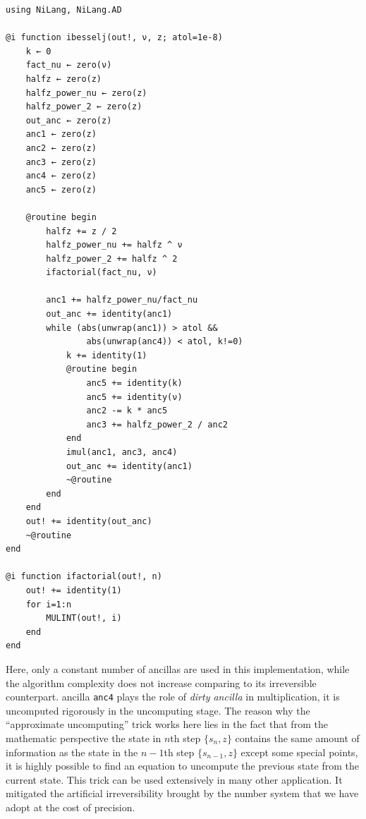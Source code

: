 \documentclass[aps,twocolumn,longbibliography,english,superscriptaddress]{revtex4-1}
\newcommand{\<}{\langle}
\renewcommand{\>}{\rangle}
\theoremstyle{definition}\newtheorem{definition}{\textit{Definition}}
\begin{document}
\begin{minipage}{.44\textwidth}
\begin{lstlisting}
using NiLang, NiLang.AD

@i function ibesselj(out!, ν, z; atol=1e-8)
    k ← 0
    fact_nu ← zero(ν)
    halfz ← zero(z)
    halfz_power_nu ← zero(z)
    halfz_power_2 ← zero(z)
    out_anc ← zero(z)
    anc1 ← zero(z)
    anc2 ← zero(z)
    anc3 ← zero(z)
    anc4 ← zero(z)
    anc5 ← zero(z)

    @routine begin
        halfz += z / 2
        halfz_power_nu += halfz ^ ν
        halfz_power_2 += halfz ^ 2
        ifactorial(fact_nu, ν)

        anc1 += halfz_power_nu/fact_nu
        out_anc += identity(anc1)
        while (abs(unwrap(anc1)) > atol &&
                abs(unwrap(anc4)) < atol, k!=0)
            k += identity(1)
            @routine begin
                anc5 += identity(k)
                anc5 += identity(ν)
                anc2 -= k * anc5
                anc3 += halfz_power_2 / anc2
            end
            imul(anc1, anc3, anc4)
            out_anc += identity(anc1)
            ~@routine
        end
    end
    out! += identity(out_anc)
    ~@routine
end

@i function ifactorial(out!, n)
    out! += identity(1)
    for i=1:n
        MULINT(out!, i)
    end
end
\end{lstlisting}
\end{minipage}

Here, only a constant number of ancillas are used in this implementation, while the algorithm complexity does not increase comparing to its irreversible counterpart.
ancilla \texttt{anc4} plays the role of \textit{dirty ancilla} in multiplication, it is uncomputed rigorously in the uncomputing stage.
The reason why the ``approximate uncomputing'' trick works here lies in the fact that from the mathematic perspective the state in $n$th step $\{s_n, z\}$ contains the same amount of information as the state in the $n-1$th step $\{s_{n-1}, z\}$ except some special points, it is highly possible to find an equation to uncompute the previous state from the current state.
This trick can be used extensively in many other application. It mitigated the artificial irreversibility brought by the number system that we have adopt at the cost of precision.
\end{document}
